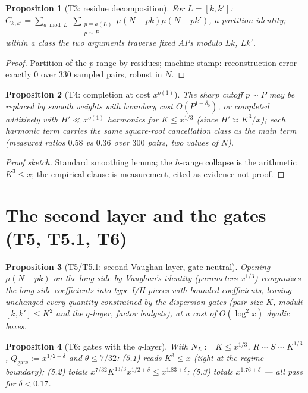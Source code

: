 \documentclass[11pt]{article}
\newtheorem{proposition}{Proposition}
\begin{document}
\begin{proposition}[T3: residue decomposition]
For $L=[k,k']$:
$C_{k,k'} = \sum_{a \bmod L}\;\sum_{\substack{p\equiv a (L)\\ p\sim P}}
\mu(N-pk)\mu(N-pk')$, a partition identity; within a class the two
arguments traverse fixed APs modulo $Lk$, $Lk'$.
\end{proposition}
\begin{proof} Partition of the $p$-range by residues; machine stamp:
reconstruction error exactly $0$ over $330$ sampled pairs, robust in
$N$. \end{proof}

\begin{proposition}[T4: completion at cost $x^{o(1)}$]
The sharp cutoff $p \sim P$ may be replaced by smooth weights with
boundary cost $O(P^{1-\delta_0})$, or completed additively with
$H' \ll x^{o(1)}$ harmonics for $K \le x^{1/3}$ (since
$H' \asymp K^3/x$); each harmonic term carries the same square-root
cancellation class as the main term (measured ratios $0.58$ vs
$0.36$ over $300$ pairs, two values of $N$).
\end{proposition}
\begin{proof}[Proof sketch] Standard smoothing lemma; the $h$-range
collapse is the arithmetic $K^3 \le x$; the empirical clause is
measurement, cited as evidence not proof. \end{proof}

\section{The second layer and the gates (T5, T5.1, T6)}

\begin{proposition}[T5/T5.1: second Vaughan layer, gate-neutral]
Opening $\mu(N-pk)$ on the long side by Vaughan's identity
(parameters $x^{1/3}$) reorganizes the long-side coefficients into
type I/II pieces with bounded coefficients, leaving unchanged every
quantity constrained by the dispersion gates (pair size $K$, moduli
$[k,k'] \le K^2$ and the $q$-layer, factor budgets), at a cost of
$O(\log^2 x)$ dyadic boxes.
\end{proposition}

\begin{proposition}[T6: gates with the $q$-layer]
With $N_L := K \le x^{1/3}$, $R \sim S \sim K^{1/3}$,
$Q_{\mathrm{gate}} := x^{1/2+\delta}$ and $\theta \le 7/32$:
(5.1) reads $K^3 \le x$ (tight at the regime boundary);
(5.2) totals $x^{7/32}K^{13/3}x^{1/2+\delta} \le x^{1.83+\delta}$;
(5.3) totals $x^{1.76+\delta}$ --- all pass for $\delta < 0.17$.
\end{proposition}
\end{document}
